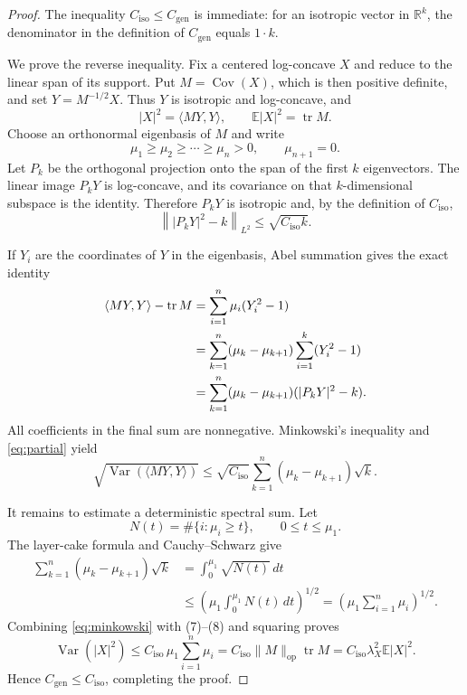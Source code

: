 \documentclass[11pt]{article}
\newcommand{\E}{\mathbb E}
\newcommand{\R}{\mathbb R}
\newcommand{\Var}{\operatorname{Var}}
\newcommand{\Cov}{\operatorname{Cov}}
\newcommand{\tr}{\operatorname{tr}}
\begin{document}
\begin{proof}
The inequality $C_{\mathrm{iso}}\leq C_{\mathrm{gen}}$ is immediate: for an
isotropic vector in $\R^k$, the denominator in the definition of
$C_{\mathrm{gen}}$ equals $1\cdot k$.

We prove the reverse inequality. Fix a centered log-concave $X$ and reduce to
the linear span of its support. Put $M=\Cov(X)$, which is then positive
definite, and set $Y=M^{-1/2}X$. Thus $Y$ is isotropic and log-concave, and
\[
 |X|^2=\langle MY,Y\rangle,\qquad
 \E|X|^2=\tr M.
\]
Choose an orthonormal eigenbasis of $M$ and write
\[
 \mu_1\geq\mu_2\geq\cdots\geq\mu_n>0,
 \qquad \mu_{n+1}=0.
\]
Let $P_k$ be the orthogonal projection onto the span of the first $k$
eigenvectors. The linear image $P_kY$ is log-concave, and its covariance on
that $k$-dimensional subspace is the identity. Therefore $P_kY$ is isotropic
and, by the definition of $C_{\mathrm{iso}}$,
\begin{equation}\label{eq:partial}
 \left\| |P_kY|^2-k\right\|_{L^2}
 \leq \sqrt{C_{\mathrm{iso}}k}.
\end{equation}

If $Y_i$ are the coordinates of $Y$ in the eigenbasis, Abel summation gives
the exact identity
\begin{align}\label{eq:abel}
 \langle MY,Y\rangle-\tr M
 &=\sum_{i=1}^n\mu_i(Y_i^2-1)\\
 &=\sum_{k=1}^n(\mu_k-\mu_{k+1})
   \sum_{i=1}^k(Y_i^2-1)\notag\\
 &=\sum_{k=1}^n(\mu_k-\mu_{k+1})(|P_kY|^2-k).\notag
\end{align}
All coefficients in the final sum are nonnegative. Minkowski's inequality and
\eqref{eq:partial} yield
\begin{equation}\label{eq:minkowski}
 \sqrt{\Var(\langle MY,Y\rangle)}
 \leq \sqrt{C_{\mathrm{iso}}}
 \sum_{k=1}^n(\mu_k-\mu_{k+1})\sqrt{k}.
\end{equation}

It remains to estimate a deterministic spectral sum. Let
\[
 N(t)=\#\{i:\mu_i\geq t\},\qquad 0\leq t\leq\mu_1.
\]
The layer-cake formula and Cauchy--Schwarz give
\begin{align}\label{eq:spectral}
 \sum_{k=1}^n(\mu_k-\mu_{k+1})\sqrt{k}
 &=\int_0^{\mu_1}\sqrt{N(t)}\,dt\\
 &\leq \left(\mu_1\int_0^{\mu_1}N(t)\,dt\right)^{1/2}
 =\left(\mu_1\sum_{i=1}^n\mu_i\right)^{1/2}.
\end{align}
Combining \eqref{eq:minkowski} with (7)--(8) and squaring proves
\[
 \Var(|X|^2)
 \leq C_{\mathrm{iso}}\,\mu_1\sum_{i=1}^n\mu_i
 =C_{\mathrm{iso}}\|M\|_{\mathrm{op}}\tr M
 =C_{\mathrm{iso}}\lambda_X^2\E|X|^2.
\]
Hence $C_{\mathrm{gen}}\leq C_{\mathrm{iso}}$, completing the proof.
\end{proof}
\end{document}

